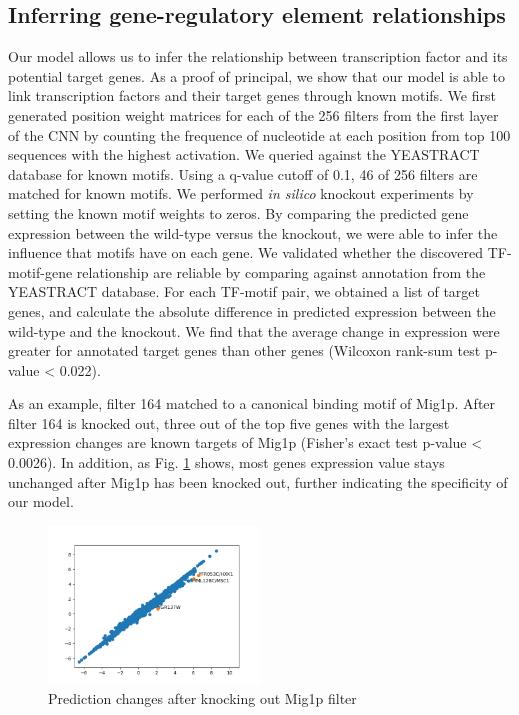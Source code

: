 \documentclass{article}
\begin{document}
\subsection{Inferring gene-regulatory element relationships}

Our model allows us to infer the relationship between transcription factor and its potential target genes. As a proof of principal, we show that our model is able to link transcription factors and their target genes through known motifs. We first generated position weight matrices for each of the 256 filters from the first layer of the CNN by counting the frequence of nucleotide at each position from top 100 sequences with the highest activation. We queried against the YEASTRACT database for known motifs. Using a q-value cutoff of 0.1, 46 of 256 filters are matched for known motifs. We performed \textit{in silico} knockout experiments by setting the known motif weights to zeros. By comparing the predicted gene expression between the wild-type versus the knockout, we were able to infer the influence that motifs have on each gene. We validated whether the discovered TF-motif-gene relationship are reliable by comparing against annotation from the YEASTRACT database. For each TF-motif pair, we obtained a list of target genes, and calculate the absolute difference in predicted expression between the wild-type and the knockout. We find that the average change in expression were greater for annotated target genes than other genes (Wilcoxon rank-sum test p-value < 0.022).  

As an example, filter 164 matched to a canonical binding motif of Mig1p. After filter 164 is knocked out, three out of the top five genes with the largest expression changes are known targets of Mig1p (Fisher's exact test p-value < 0.0026). In addition, as Fig. \ref{mig1p} shows, most genes expression value stays unchanged after Mig1p has been knocked out, further indicating the specificity of our model. 

\begin{figure}
\center
\includegraphics[width=0.5\textwidth]{fig/mig1p_filter164.png}
\caption{Prediction changes after knocking out Mig1p filter}
\label{mig1p}
\end{figure}
\end{document}
